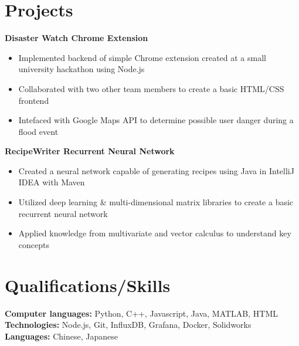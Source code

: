 \documentclass[letterpaper,11pt]{article}
\begin{document}
\section{Projects}
\textbf{Disaster Watch Chrome Extension}\\
\begin{itemize}[noitemsep, topsep=0pt] %
  \item Implemented backend of simple Chrome extension created at a small university hackathon using Node.js
  \item Collaborated with two other team members to create a basic HTML/CSS frontend
  \item Intefaced with Google Maps API to determine possible user danger during a flood event
\end{itemize}
\textbf{RecipeWriter Recurrent Neural Network}\\
\begin{itemize}[noitemsep, topsep=0pt]
  \item Created a neural network capable of generating recipes using Java in IntelliJ IDEA with Maven
  \item Utilized deep learning \& multi-dimensional matrix libraries to create a basic recurrent neural network
  \item Applied knowledge from multivariate and vector calculus to understand key concepts
\end{itemize}
\section{Qualifications/Skills}
\textbf{Computer languages:} Python, C++, Javascript, Java, MATLAB, HTML\\
\textbf{Technologies:} Node.js, Git, InfluxDB, Grafana, Docker, Solidworks\\
\textbf{Languages:} Chinese, Japanese\\
\end{document}
